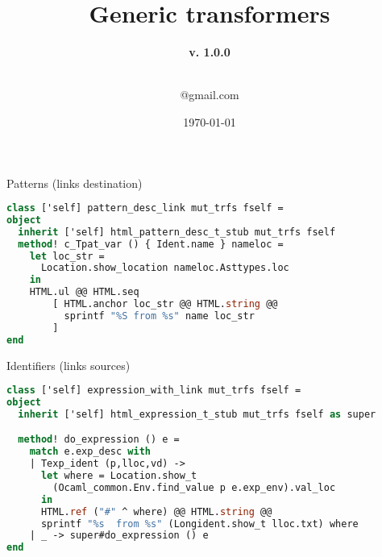 \documentclass[10pt]{beamer}
\title[] %
{ %
      \textbf{Generic transformers}
}
\subtitle[The Feather Beamer Theme]
{
      \textbf{v. 1.0.0}
}
\author[]
{      \\
      {\ttfamily 1@gmail.com}
}
\institute[]
{
      SPbSU
}
\date{\today}
\begin{document}
\begin{frame}[fragile]{Patterns (links destination)}
\begin{lstlisting}[language=ocaml] 
class ['self] pattern_desc_link mut_trfs fself = 
object
  inherit ['self] html_pattern_desc_t_stub mut_trfs fself
  method! c_Tpat_var () { Ident.name } nameloc =
    let loc_str = 
      Location.show_location nameloc.Asttypes.loc 
    in
    HTML.ul @@ HTML.seq
        [ HTML.anchor loc_str @@ HTML.string @@ 
          sprintf "%S from %s" name loc_str
        ]
end
\end{lstlisting}
\end{frame}

\begin{frame}[fragile]{Identifiers (links sources)}
\begin{lstlisting}[language=ocaml] 
class ['self] expression_with_link mut_trfs fself = 
object
  inherit ['self] html_expression_t_stub mut_trfs fself as super

  method! do_expression () e =
    match e.exp_desc with
    | Texp_ident (p,lloc,vd) ->
      let where = Location.show_t
        (Ocaml_common.Env.find_value p e.exp_env).val_loc 
      in
      HTML.ref ("#" ^ where) @@ HTML.string @@
      sprintf "%s  from %s" (Longident.show_t lloc.txt) where
    | _ -> super#do_expression () e
end
\end{lstlisting}
\end{frame}
\end{document}
